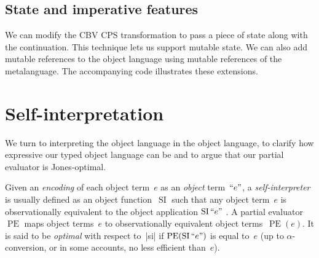 \documentclass[preprint]{sigplanconf}
\newcommand{\Encode}[1]{\mathinner{\mathopen{\text{``}}#1\mathclose{\text{''}}}}
\DeclareMathOperator{\pe}{PE}
\DeclareMathOperator{\si}{SI}
\begin{document}
\subsection{State and imperative features}
\label{state}

We can modify the CBV CPS transformation to pass a piece of state along
with the continuation. This technique lets us support mutable state. We
can also add mutable references to the object language using mutable
references of the metalanguage.  The accompanying code illustrates these
extensions.

\section{Self-interpretation}\label{selfinterp}

We turn to interpreting the object language in the object language, to
clarify how expressive our typed object language can be and to argue that our
partial evaluator is Jones\hyp optimal.

Given an \emph{encoding} of each object term~$e$ as an \emph{object} term~$\Encode{e}$,
a \emph{self\hyp interpreter} is usually defined as an object
function~$\si$ such that any object term~$e$ is observationally
equivalent to the object application $\si\Encode{e}$
\citep{jones-partial,taha-tag,Danvy-tagging-encoding}.
A partial evaluator~$\pe$ maps object terms~$e$ to observationally
equivalent object terms~$\pe(e)$.  It is said to be
\emph{optimal} with respect to~|si| if $\pe(\si\Encode{e})$
is equal to~$e$ (up to $\alpha$\hyp conversion, or in some accounts, no
less efficient than~$e$).
\end{document}
